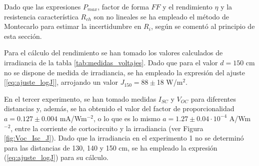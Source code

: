 \vspace{\baselineskip}

Dado que las expresiones $P_{max}$,  factor de forma $FF$ y el rendimiento $\eta$ y la resistencia característica $R_{ch}$ son no lineales  se ha empleado el método de Montecarlo para estimar la incertidumbre en \(R_i\),  según se comentó al principio de esta sección.


\vspace{\baselineskip}

 Para el cálculo del rendimiento se han tomado los valores calculados de irradiancia de la tabla \ref{tab:medidas_voltajes}. Dado que para el  valor $d=150$ cm no se dispone de medida de irradiancia, se ha empleado la expresión del ajuste [\ref{eq:ajuste_logJ}], arrojando un valor $J_{150} =  88\pm$18 W/m$^2$.

\vspace{\baselineskip}

En el tercer experimento, se han tomado medidas $I_{SC}$ y $V_{OC}$ para diferentes distancias y, además, se ha obtenido el valor del factor de proporcionalidad $a = 0.127\pm0.004$ mA/Wm$^{-2}$, o lo que es lo mismo $a=1.27\pm0.04 \cdot 10^{-4}$ A/Wm$^{-2}$, entre la corriente de cortocircuito y la irradiancia (ver Figura \ref{fig:Voc_Isc_J}). Dado que la irradiancia en el experimento 1 no se determinó para las distancias de 130, 140 y 150 cm, se ha empleado la expresión (\ref{eq:ajuste_logJ}) para su cálculo.


\vspace{\baselineskip}

